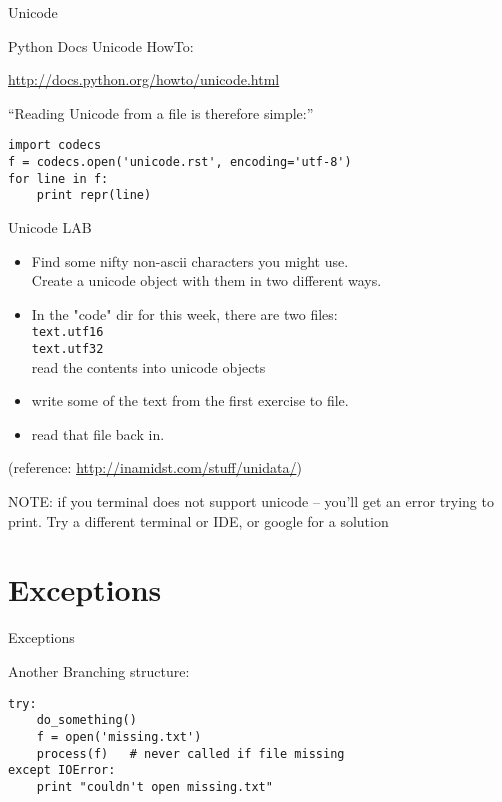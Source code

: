 \documentclass{beamer}
\begin{document}
\begin{frame}[fragile]{Unicode}

{\Large Python Docs Unicode HowTo:}

\url{http://docs.python.org/howto/unicode.html}

\vfill
``Reading Unicode from a file is therefore simple:''

\begin{verbatim}
import codecs
f = codecs.open('unicode.rst', encoding='utf-8')
for line in f:
    print repr(line)
\end{verbatim}

\end{frame}

\begin{frame}[fragile]{Unicode LAB}

\begin{itemize}
  \item Find some nifty non-ascii characters you might use.\\
        Create a unicode object with them in two different ways.
  \item In the "code" dir for this week, there are two files:\\
        \verb|text.utf16| \\
        \verb|text.utf32| \\
        read the contents into unicode objects
  \item write some of the text from the first exercise to file.
  \item read that file back in.
\end{itemize}

\vfill
(reference: \url{http://inamidst.com/stuff/unidata/})

\vfill
NOTE: if you terminal does not support unicode -- you'll get an error trying
to print. Try a different terminal or IDE, or google for a solution
\end{frame}


\section{Exceptions}

\begin{frame}[fragile]{Exceptions}

{\Large Another Branching structure:}
\vfill
\begin{verbatim}
try:
    do_something()
    f = open('missing.txt')
    process(f)   # never called if file missing
except IOError:
    print "couldn't open missing.txt"
\end{verbatim}
\vfill
\end{frame}
\end{document}
